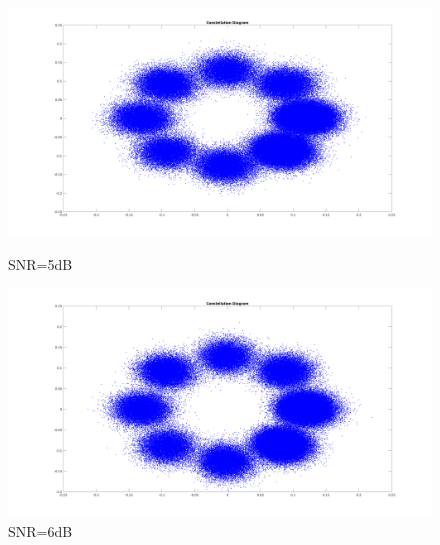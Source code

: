 \begin{spacing}{1.5}
\begin{figure}[H]
\begin{minipage}[t]{0.5\linewidth}
\centering
\includegraphics[width=0.9\columnwidth]{constellation11.png}
\caption{SNR=5dB}
\end{minipage}
\hfill
\begin{minipage}[t]{0.5\linewidth}
\centering
\includegraphics[width=0.9\columnwidth]{constellation12.png}
\caption{SNR=6dB}
\end{minipage}
\end{figure}



\end{spacing}
